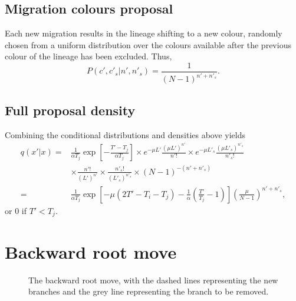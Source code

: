 \documentclass[a4paper,11pt]{article}
\begin{document}
\subsection{Migration colours proposal}

Each new migration results in the lineage shifting to a new colour,
randomly chosen from a uniform distribution over the colours available
after the previous colour of the lineage has been excluded.  Thus,
\begin{equation}
  P(c',c'_s|n',n'_s)=\frac{1}{(N-1)^{n'+n'_s}}.
\end{equation}

\subsection{Full proposal density}

Combining the conditional distributions and densities above yields
\begin{align}
  q(x'|x)=&\frac{1}{\alpha T_j}\exp\left[-\frac{T'-T_j}{\alpha T_j}\right]
  \times e^{-\mu L'}\frac{(\mu L')^{n'}}{n'!}
  \times e^{-\mu L'_s}\frac{(\mu L'_s)^{n'_s}}{n'_s!}\nonumber\\
  &\times \frac{n'!}{(L')^{n'}}
  \times \frac{n'_s!}{(L'_s)^{n'_s}}
  \times (N-1)^{-(n'+n'_s)}\nonumber\\
=&\frac{1}{\alpha T_j}\exp\left[-\mu(2T'-T_i-T_j)-\frac{1}{\alpha}\left(\frac{T'}{T_j}-1\right)\right]\left(\frac{\mu}{N-1}\right)^{n'+n'_s},
\end{align}
or $0$ if $T'<T_j$.

\section{Backward root move}

\begin{figure}
\begin{center}
\end{center}
\caption{The backward root move, with the dashed lines representing
the new branches and the grey line representing the branch to be
removed.}
\end{figure}
\end{document}
